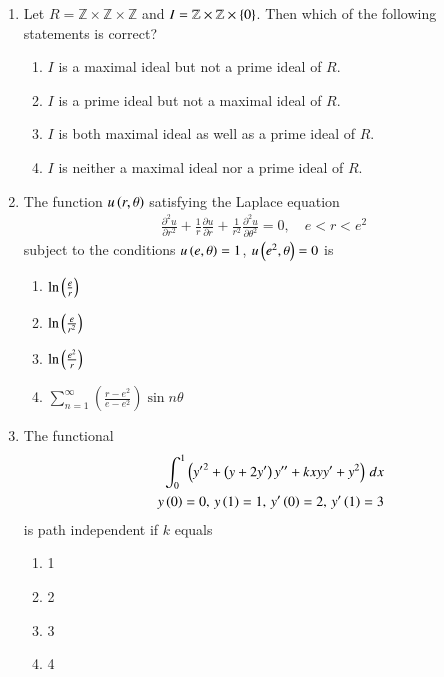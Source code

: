 \documentclass[journal]{IEEEtran}
\begin{document}
\begin{enumerate} 

	\item Let $R = \mathbb{Z} \times \mathbb{Z} \times \mathbb{Z}$ and $I = \mathbb{Z} \times \mathbb{Z} \times \left\{0\right\}$.  
Then which of the following statements is correct?

\begin{enumerate}
    \item $I$ is a maximal ideal but not a prime ideal of $R$.
    \item $I$ is a prime ideal but not a maximal ideal of $R$.
    \item $I$ is both maximal ideal as well as a prime ideal of $R$.
    \item $I$ is neither a maximal ideal nor a prime ideal of $R$.
\end{enumerate}

\item The function $u \left(r, \theta\right)$ satisfying the Laplace equation
\begin{align}
\frac{\partial^2 u}{\partial r^2} + \frac{1}{r} \frac{\partial u}{\partial r} + \frac{1}{r^2} \frac{\partial^2 u}{\partial \theta^2} = 0, \quad e < r < e^2
\end{align}
subject to the conditions $u \left(e, \theta\right) = 1$, $u \left(e^2, \theta\right) = 0$ is

\begin{enumerate}
    \item $\ln \left(\frac{e}{r}\right)$
    \item $\ln \left(\frac{e}{r^2}\right)$
    \item $\ln \left(\frac{e^2}{r}\right)$
    \item $\sum_{n=1}^{\infty} \left( \frac{r - e^2}{e - e^2} \right) \sin n\theta$
\end{enumerate}

\item The functional
\begin{align}
	\int_{0}^{1} \left( {y^{\prime}}^2 + \left(y + 2y^{\prime}\right) y^{\prime \prime} + kxyy^{\prime} + y^2 \right) \, dx 
	\\ \quad y \left(0\right) = 0, \, y \left(1\right) = 1, \, y^\prime \left(0\right) = 2, \, y^\prime \left(1\right) = 3
\end{align}
is path independent if $k$ equals

\begin{enumerate}
    \item 1
    \item 2
    \item 3
    \item 4
\end{enumerate}


\end{enumerate}
\end{document}
